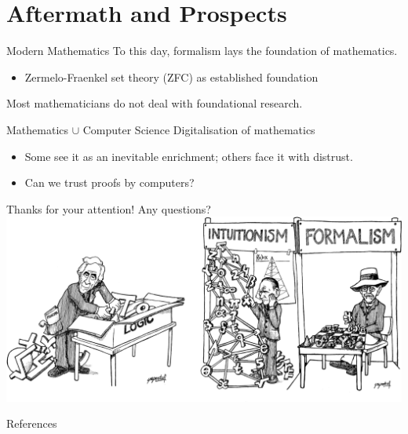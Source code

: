 \documentclass{beamer}
\begin{document}
\section{Aftermath and Prospects}
\begin{frame}{Modern Mathematics}
To this day, formalism lays the foundation of mathematics.
\pause
\begin{itemize}
	\item Zermelo-Fraenkel set theory (ZFC) as established foundation
\end{itemize}
\pause
Most mathematicians do not deal with foundational research.
\end{frame}
\begin{frame}{Mathematics $\cup$ Computer Science}
Digitalisation of mathematics
\pause
    \begin{itemize}[<+->]
	\item Some see it as an inevitable enrichment; others face it with distrust.
	\item Can we trust proofs by computers?
    \end{itemize}
\end{frame}
\begin{frame}
\end{frame}
\begin{frame}
	\center
	\Large{Thanks for your attention! Any questions?}
	\vspace{0.5\baselineskip}\\
	\includegraphics[height=0.6\textheight]{img/logic_intuit_form2.png}
\end{frame}
\begin{frame}[allowframebreaks]{References}
  
  
\end{frame}
\end{document}
